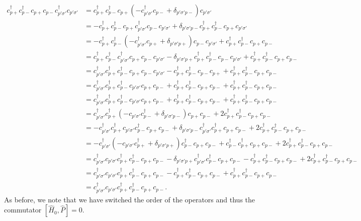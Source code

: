 \documentclass[a4paper]{article}
\newcommand{\nn}{\nonumber}
\newcommand{\cpp}{c_{p+}}
\newcommand{\cpm}{c_{p-}}
\begin{document}
\begin{align}
\cpp^\dagger \cpm^\dagger \cpp \cpm c_{p'\sigma'}^\dagger c_{p'\sigma'} &= \cpp^\dagger \cpm^\dagger \cpp (-c_{p'\sigma'}^\dagger \cpm + \delta_{p'\sigma' p-}) c_{p'\sigma'} \nn\\
%
&= -\cpp^\dagger \cpm^\dagger \cpp c_{p'\sigma'}^\dagger \cpm c_{p'\sigma'}  + \delta_{p'\sigma' p-}  \cpp^\dagger \cpm^\dagger \cpp c_{p'\sigma'} \nn\\
%
&= -\cpp^\dagger \cpm^\dagger (-c_{p'\sigma'}^\dagger \cpp + \delta_{p'\sigma'p+}) \cpm c_{p'\sigma'}  +  \cpp^\dagger \cpm^\dagger \cpp \cpm \nn\\
%
&= \cpp^\dagger \cpm^\dagger c_{p'\sigma'}^\dagger \cpp \cpm c_{p'\sigma'}  - \delta_{p'\sigma'p+}\cpp^\dagger \cpm^\dagger \cpm c_{p'\sigma'}  +  \cpp^\dagger \cpm^\dagger \cpp \cpm \nn\\
%
&= c_{p'\sigma'}^\dagger \cpp^\dagger \cpm^\dagger \cpp \cpm c_{p'\sigma'}   - \cpp^\dagger \cpm^\dagger \cpm \cpp +  \cpp^\dagger \cpm^\dagger \cpp \cpm \nn\\
%
&= c_{p'\sigma'}^\dagger \cpp^\dagger \cpm^\dagger c_{p'\sigma'} \cpp \cpm    + \cpp^\dagger \cpm^\dagger \cpp \cpm  +  \cpp^\dagger \cpm^\dagger \cpp \cpm \nn\\
%
&= c_{p'\sigma'}^\dagger \cpp^\dagger \cpm^\dagger c_{p'\sigma'} \cpp \cpm    + \cpp^\dagger \cpm^\dagger \cpp \cpm  +  \cpp^\dagger \cpm^\dagger \cpp \cpm \nn\\
%
&= c_{p'\sigma'}^\dagger \cpp^\dagger (-c_{p'\sigma'}\cpm^\dagger + \delta_{p'\sigma'p-}) \cpp \cpm   +  2\cpp^\dagger \cpm^\dagger \cpp \cpm \nn\\
%
&= -c_{p'\sigma'}^\dagger \cpp^\dagger c_{p'\sigma'}\cpm^\dagger \cpp \cpm + \delta_{p'\sigma'p-} c_{p'\sigma'}^\dagger \cpp^\dagger  \cpp \cpm   +  2\cpp^\dagger \cpm^\dagger \cpp \cpm \nn\\
%
&= -c_{p'\sigma'}^\dagger (-c_{p'\sigma'}\cpp^\dagger +\delta_{p'\sigma'p+}) \cpm^\dagger \cpp \cpm + \cpm^\dagger \cpp^\dagger  \cpp \cpm   +  2\cpp^\dagger \cpm^\dagger \cpp \cpm \nn\\
%
&= c_{p'\sigma'}^\dagger c_{p'\sigma'}\cpp^\dagger \cpm^\dagger \cpp \cpm - \delta_{p'\sigma'p+} c_{p'\sigma'}^\dagger \cpm^\dagger \cpp \cpm - \cpp^\dagger\cpm^\dagger  \cpp \cpm   +  2\cpp^\dagger \cpm^\dagger \cpp \cpm \nn\\
%
&= c_{p'\sigma'}^\dagger c_{p'\sigma'}\cpp^\dagger \cpm^\dagger \cpp \cpm - \cpp^\dagger \cpm^\dagger \cpp \cpm  +  \cpp^\dagger \cpm^\dagger \cpp \cpm \nn\\
%
&= c_{p'\sigma'}^\dagger c_{p'\sigma'}\cpp^\dagger \cpm^\dagger \cpp \cpm. \label{eq:1}
\end{align}
As before, we note that we have switched the order of the operators and thus the commutator $[\hat H_0,\hat P]=0$.
\end{document}
